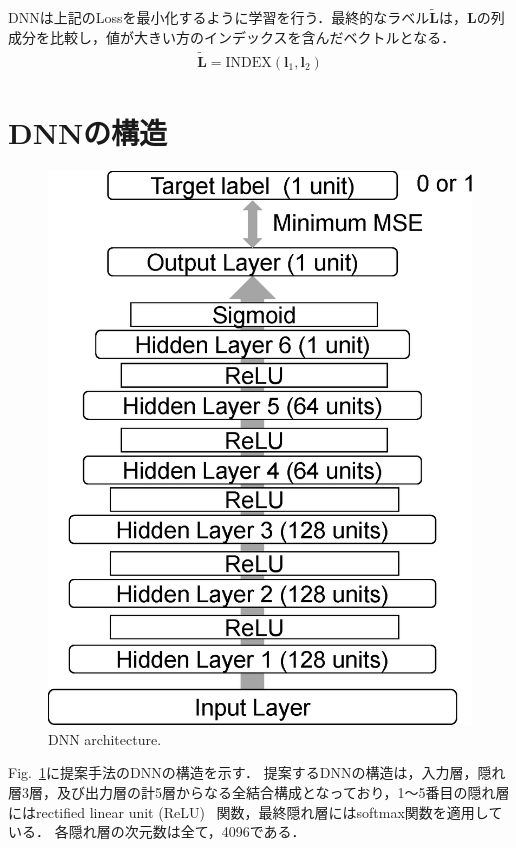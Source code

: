 DNNは上記のLossを最小化するように学習を行う．最終的なラベル$\widetilde{\bm{L}}$は，$\bm{L}$の列成分を比較し，値が大きい方のインデックスを含んだベクトルとなる．
\begin{align}
    \widetilde{\bm{L}} = \mathrm{INDEX}(\bm{l}_1, \bm{l}_2)
\end{align}

\clearpage
\section{DNNの構造}
\label{sec:model}
\begin{figure}[h]
    \begin{center}
        \includegraphics[width=0.8\columnwidth]{figures/DNNmodel}
    \end{center}
    \vspace{-8pt}
	\caption{DNN architecture.}
	\label{fig:Dnnmodel}
\end{figure}

Fig.~\ref{fig:Dnnmodel}に提案手法のDNNの構造を示す．
提案するDNNの構造は，入力層，隠れ層3層，及び出力層の計5層からなる全結合構成となっており，1～5番目の隠れ層にはrectified linear unit (ReLU)~\cite{relu} 関数，最終隠れ層にはsoftmax関数を適用している．
各隠れ層の次元数は全て，4096である．

